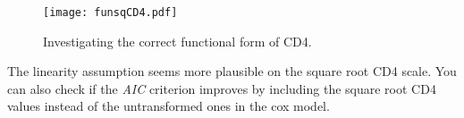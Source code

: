 \begin{enumerate}[(a)]
\begin{enumerate}[(i)]
\begin{figure}[htbp]
	\centering
		\texttt{[image: funsqCD4.pdf]}
	\caption{Investigating the correct functional form of CD4.}
	\label{figure7}
\end{figure}
The linearity assumption seems more plausible on the square root CD4 scale. You can also check if the \emph{AIC} criterion improves by including the square root CD4 values instead of the untransformed ones in the cox model.


\end{enumerate}
\end{enumerate}